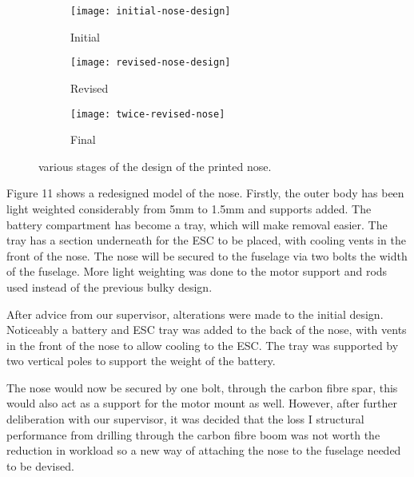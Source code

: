 \documentclass[../../main.tex]{subfiles}
\begin{document}
\begin{figure}[H]
    \centering
    \begin{subfigure}[b]{0.6\columnwidth}
        \centering
        \texttt{[image: initial-nose-design]}
        \caption{Initial}
        \label{fig:nose-design-progression:initial}
    \end{subfigure}
    
    \begin{subfigure}[b]{0.6\columnwidth}
        \centering
        \texttt{[image: revised-nose-design]}
        \caption{Revised}
        \label{fig:nose-design-progression:revised}
    \end{subfigure}

    \begin{subfigure}[b]{0.6\columnwidth}
        \centering
        \texttt{[image: twice-revised-nose]}
        \caption{Final}
        \label{fig:nose-design-progression:final}
    \end{subfigure}
    
    \caption{various stages of the design of the printed nose.}
    \label{fig:nose-design-progression}
\end{figure} 


Figure 11 shows a redesigned model of the nose.
Firstly, the outer body has been light weighted considerably from 5mm to 1.5mm and supports added.
The battery compartment has become a tray, which will make removal easier.
The tray has a section underneath for the ESC to be placed, with cooling vents in the front of the nose.
The nose will be secured to the fuselage via two bolts the width of the fuselage.
More light weighting was done to the motor support and rods used instead of the previous bulky design. 


After advice from our supervisor, alterations were made to the initial design.
Noticeably a battery and ESC tray was added to the back of the nose, with vents in the front of the nose to allow cooling to the ESC.
The tray was supported by two vertical poles to support the weight of the battery. 


The nose would now be secured by one bolt, through the carbon fibre spar, this would also act as a support for the motor mount as well.
However, after further deliberation with our supervisor, it was decided that the loss I structural performance from drilling through the carbon fibre boom was not worth the reduction in workload so a new way of attaching the nose to the fuselage needed to be devised.  
\end{document}
